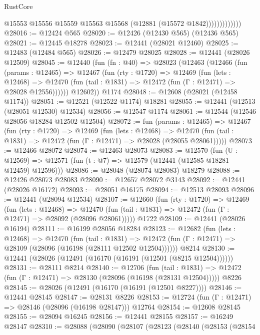 \begin{lexlean}{RustCore}
\begin{coremodule}
                          @15553
                          @15556
                          @15559
                          @15563
                          @15568
                          (@12881 (@15572 @1842)))))))))))))
@28016 := @12424 @565
@28020 := @12426 (@12430 @565) (@12436 @565)
@28021 := @12445 @18278
@28023 := @12441 (@28021 @12460)
@28025 := @12483 (@12484 @565)
@28026 := @12479 @28025
@28028 := @12441 (@28026 @12509)
@28045 := @12440
    (fun (fn : @40) =>
    @28023
      (@12463
        (@12466
          (fun (params : @12465) =>
          @12467
            (fun (rty : @1720) =>
            @12469
              (fun (lets : @12468) =>
              @12470 (fun (tail : @1831) => @12472 (fun (Γ : @12471) => @28028 @12556))))))
        @12602))
    @1174
@28048 := @12608 (@28021 (@12458 @1174))
@28051 := @12521 (@12522 @1174) @18281
@28055 := @12441 (@12513 (@28051 @12530) @12534)
@28056 := @12547 @1174
@28061 := @12544 (@12546 @28056 @18284 @12502 @12504)
@28072 := fun (params : @12465) =>
  @12467
    (fun (rty : @1720) =>
    @12469
      (fun (lets : @12468) =>
      @12470 (fun (tail : @1831) => @12472 (fun (Γ : @12471) => @28028 (@28055 @28061)))))
@28073 := @12466 @28072
@28074 := @12463 @28073
@28083 := @12570
    (fun (U : @12569) => @12571 (fun (t : @7) => @12579 (@12441 (@12585 @18281 @12459) @12596)))
@28086 := @28048 (@28074 @28083) @18279
@28088 := @12426 @28073 @28083
@28090 := @12657 @28072 @3143
@28092 := @12441 (@28026 @16172)
@28093 := @28051 @16175
@28094 := @12513 @28093
@28096 := @12441 (@28094 @12534)
@28107 := @12660
    (fun (rty : @1720) =>
    @12469
      (fun (lets : @12468) =>
      @12470 (fun (tail : @1831) => @12472 (fun (Γ : @12471) => @28092 (@28096 @28061)))))
    @1722
@28109 := @12441 (@28026 @16194)
@28111 := @16199 @28056 @18284
@28123 := @12682
    (fun (lets : @12468) =>
    @12470
      (fun (tail : @1831) =>
      @12472 (fun (Γ : @12471) => @28109 (@28096 (@16198 (@28111 @12502 @12504))))))
    @8214
@28130 := @12441 (@28026 (@12491 (@16170 (@16191 (@12501 (@8215 @12504))))))
@28131 := @28111 @8214
@28140 := @12706
    (fun (tail : @1831) => @12472 (fun (Γ : @12471) => @28130 (@28096 (@16198 (@28131 @12504)))))
    @8226
@28145 := @28026 (@12491 (@16170 (@16191 (@12501 @8227))))
@28146 := @12441 @28145
@28147 := @28131 @8226
@28153 := @12724 (fun (Γ : @12471) => @28146 (@28096 (@16198 @28147))) @12764
@28154 := @12608 @28145
@28155 := @28094 @16245
@28156 := @12441 @28155
@28157 := @16249 @28147
@28310 := @28088
    (@28090
      (@28107
        (@28123
          (@28140
            (@28153
              (@28154

\end{coremodule}
\end{lexlean}
